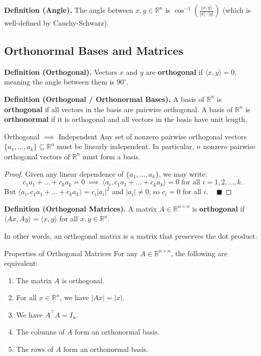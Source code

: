 \textbf{Definition (Angle).} The angle between $x, y \in \mathbb{R}^n$ is $\cos^{-1}\left(\frac{\langle x, y \rangle}{|x| \cdot |y|}\right)$ (which is well-defined by Cauchy-Schwarz).

\subsection{Orthonormal Bases and Matrices}

\textbf{Definition (Orthogonal).} Vectors $x$ and $y$ are \textbf{orthogonal} if $\langle x, y \rangle = 0$, meaning the angle between them is $90^{\circ}$.

\textbf{Definition (Orthogonal / Orthonormal Bases).} A basis of $\mathbb{R}^n$ is \textbf{orthogonal} if all vectors in the basis are pairwise orthogonal.  A basis of $\mathbb{R}^n$ is \textbf{orthonormal} if it is orthogonal and all vectors in the basis have unit length.

\begin{theorem}{Orthogonal $\implies$ Independent}
    Any set of nonzero pairwise orthogonal vectors $\{a_1, \dots, a_k \} \subseteq \mathbb{R}^n$ must be linearly independent.  In particular, $n$ nonzero pairwise orthogonal vectors of $\mathbb{R}^n$ must form a basis.
\end{theorem}

\begin{proof}
    Given any linear dependence of $\{a_1, \dots, a_k\}$, we may write:
    \[ c_1a_1 + \dots + c_k a_k  = 0 ~ \implies ~ \langle a_i, c_1 a_1 + \dots + c_k a_k \rangle = 0 \text{ for all } i = 1, 2, \dots, k. \]
    But $\langle a_i, c_1 a_1 + \dots + c_k a_k \rangle = c_i |a_i|^2$ and $|a_i| \neq 0$, so $c_i = 0$ for all $i$. ~ $\blacksquare$
\end{proof}

\textbf{Definition (Orthogonal Matrices).} A matrix $A \in \mathbb{R}^{n \times n}$ is \textbf{orthogonal} if $\langle Ax, Ay \rangle = \langle x, y \rangle$ for all $x, y \in \mathbb{R}^n$.

In other words, an orthogonal matrix is a matrix that preserves the dot product.

\begin{theorem}{Properties of Orthogonal Matrices}
    For any $A \in \mathbb{R}^{n \times n}$, the following are equivalent:
    \begin{enumerate}
        \item The matrix $A$ is orthogonal.
        \item For all $x \in \mathbb{R}^n$, we have $|Ax| = |x|$.
        \item We have $A^{\top}A = I_n$.
        \item The columns of $A$ form an orthonormal basis.
        \item The rows of $A$ form an orthonormal basis.
    \end{enumerate}
\end{theorem}

